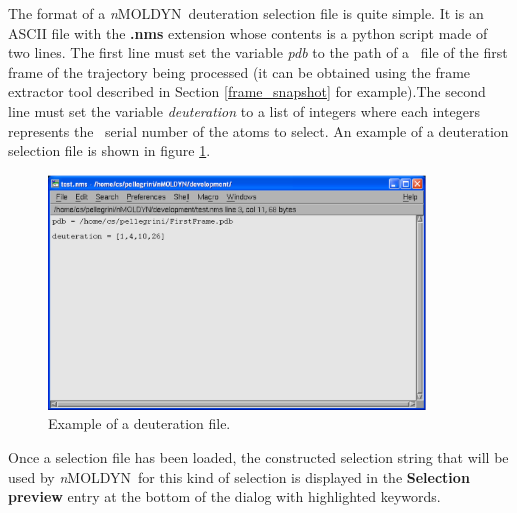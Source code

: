 \documentclass[a4paper,11pt]{report}
\newcommand{\NMOLDYN}{\textit{n}MOLDYN}
\begin{document}
The format of a \NMOLDYN\ deuteration selection file is quite simple. It is an ASCII file with the \textbf{.nms} extension whose 
contents is a python script made of two lines. The first line must set the variable \textit{pdb} to the path of a \PDB\ file 
of the first frame of the trajectory being processed (it can be obtained using the frame extractor tool described in 
Section \ref{frame_snapshot} for example).The second line must set the variable \textit{deuteration} to a list of integers 
where each integers represents the \PDB\ serial number of the atoms to select. An example of a deuteration selection file 
is shown in figure \ref{fig:deuteration_selection_file}.
\begin{figure}[h!]
\begin{center}
\includegraphics[width=10cm]{Figures/deuteration_selection_file.eps}
\end{center}
\caption[Example of a deuteration selection file]{Example of a deuteration file.}
\label{fig:deuteration_selection_file}
\end{figure}   

Once a selection file has been loaded, the constructed selection string that will be used by \NMOLDYN\ for this kind of 
selection is displayed in the \textbf{Selection preview} entry at the bottom of the dialog with highlighted keywords.
\newpage
\end{document}
